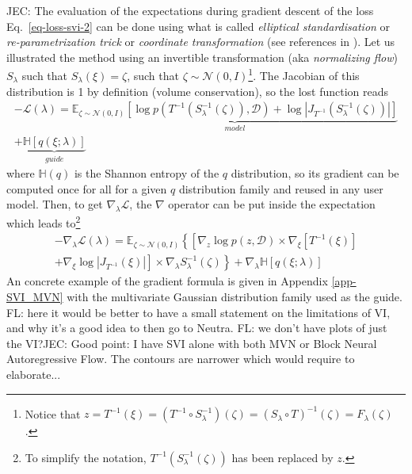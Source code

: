 \documentclass[twocolumn,twocolappendix,nofootinbib,iop]{openjournal}
\newcommand{\FrL}[1]{{\color{cyan}FL: #1}}
\newcommand{\JEC}[1]{{\color{magenta}JEC: #1}}
\begin{document}
\JEC{
The evaluation of the expectations during gradient descent of the loss Eq.~\ref{eq-loss-svi-2} can be done using what is called \textit{elliptical standardisation} or \textit{re-parametrization trick} or \textit{coordinate transformation} (see references in \cite{10.5555/2969239.2969303}).  Let us illustrated the method using an invertible transformation (aka \textit{normalizing flow})  $S_\lambda$ such that $S_\lambda(\xi)=\zeta$, such that $\zeta\sim \mathcal{N}(0,I)$\footnote{Notice that $z=T^{-1}(\xi)=(T^{-1} \circ S_\lambda^{-1})(\zeta)=(S_\lambda \circ T)^{-1}(\zeta)=F_\lambda(\zeta)$.}. The Jacobian of this distribution is 1 by definition (volume conservation), so the lost function reads
\begin{multline}
-\mathcal{L}(\lambda) = \underbrace{\mathbb{E}_{\zeta\sim \mathcal{N}(0,I)}\left[ \log p(T^{-1}(S_\lambda^{-1}(\zeta)),\mathcal{D}) + \log |J_{T^{-1}}(S_\lambda^{-1}(\zeta))| \right]}_{model} \\ + \underbrace{\mathbb{H}[q(\xi;\lambda)]}_{guide}
\label{eq-loss-svi-3}
\end{multline}
where $\mathbb{H}(q)$ is the Shannon entropy of the $q$ distribution, so its gradient can be computed once for all for a given $q$ distribution family and reused in any user model.  
Then,
to get $\nabla_\lambda \mathcal{L}$, the $\nabla$ operator can be put inside the expectation which leads to\footnote{To simplify the notation, $T^{-1}(S_\lambda^{-1}(\zeta))$ has been replaced by $z$.}
\begin{multline}
-\nabla_\lambda\mathcal{L}(\lambda) = \mathbb{E}_{\zeta\sim \mathcal{N}(0,I)}\left\{
\left[ \nabla_z \log p(z,\mathcal{D}) \times \nabla_\xi[T^{-1}(\xi)] \right. \right. \\
+ \left. \left. \nabla_\xi \log|J_{T^{-1}}(\xi)| \right] \times \nabla_\lambda S_\lambda^{-1}(\zeta)
\right\}
+ \nabla_\lambda \mathbb{H}[q(\xi;\lambda)]
\label{eq-loss-svi-4}
\end{multline}
An concrete example of the gradient formula is given in Appendix \ref{app-SVI_MVN} with the multivariate Gaussian distribution family used as the guide.
}%
%
\FrL{here it would be better to have a small statement on the limitations of VI, and why it's a good idea to then go to Neutra.} 
\FrL{we don't have plots of just the VI?}\JEC{Good point: I have SVI alone with both MVN or Block Neural Autoregressive Flow. The contours are narrower which would require to elaborate...}
\end{document}
